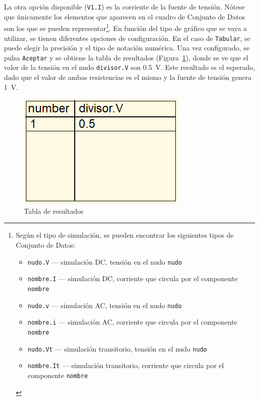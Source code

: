 \documentclass[a4paper,10pt]{article} %
\begin{document}
La otra opción disponible (\texttt{V1.I}) es la corriente de la fuente de tensión. Nótese que únicamente los elementos que aparecen en el cuadro de Conjunto de Datos son los que se pueden representar\footnote{Según el tipo de simulación, se pueden encontrar los siguientes tipos de Conjunto de Datos:
\begin{itemize}
    \item \texttt{nudo.V} --– simulación DC, tensión en el nudo \texttt{nudo}
    \item \texttt{nombre.I} –-- simulación DC, corriente que circula por el componente \texttt{nombre}
    \item \texttt{nudo.v} --– simulación AC, tensión en el nudo \texttt{nudo}
    \item \texttt{nombre.i} –-- simulación AC, corriente que circula por el componente \texttt{nombre}
    \item \texttt{nudo.Vt} –-- simulación transitorio, tensión en el nudo \texttt{nudo}
    \item \texttt{nombre.It} --– simulación transitorio, corriente que circula por el componente \texttt{nombre}
\end{itemize}}. En función del tipo de gráfico que se vaya a utilizar, se tienen diferentes opciones de configuración. En el caso de \texttt{Tabular}, se puede elegir la precisión y el tipo de notación numérica. Una vez configurado, se pulsa \texttt{Aceptar} y se obtiene la tabla de resultados (Figura~\ref{fig.qucs14}), donde se ve que el valor de la tensión en el nudo \texttt{divisor.V} son \qty{0.5}{\volt}. Este resultado es el esperado, dado que el valor de ambas resistencias es el mismo y la fuente de tensión genera \qty{1}{\volt}. 
\begin{figure}[htbp]
    \centering
    \includegraphics[width=0.25\linewidth]{../figs/qucs14.PNG}
    \caption{Tabla de resultados}
    \label{fig.qucs14}
\end{figure}
\end{document}
